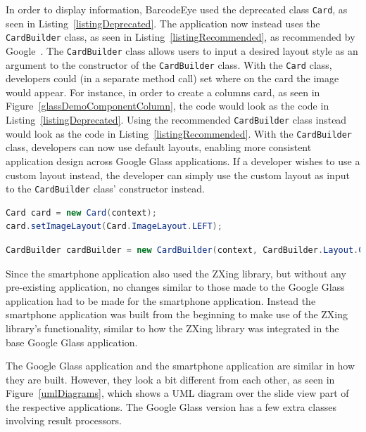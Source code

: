 In order to display information, BarcodeEye used the deprecated class \texttt{Card}, as seen in Listing~\ref{listingDeprecated}. The application now instead uses the \texttt{CardBuilder} class, as seen in Listing~\ref{listingRecommended}, as recommended by Google~\cite{googleCard}. The \texttt{CardBuilder} class allows users to input a desired layout style as an argument to the constructor of the \texttt{CardBuilder} class. With the \texttt{Card} class, developers could (in a separate method call) set where on the card the image would appear. For instance, in order to create a columns card, as seen in Figure~\ref{glassDemoComponentColumn}, the code would look as the code in Listing~\ref{listingDeprecated}. Using the recommended \texttt{CardBuilder} class instead would look as the code in Listing~\ref{listingRecommended}. With the \texttt{CardBuilder} class, developers can now use default layouts, enabling more consistent application design across Google Glass applications. If a developer wishes to use a custom layout instead, the developer can simply use the custom layout as input to the \texttt{CardBuilder} class' constructor instead.

\begin{lstlisting}[language=Java, caption={Instancing of the deprecated class Card}, label=listingDeprecated]
Card card = new Card(context);
card.setImageLayout(Card.ImageLayout.LEFT);
\end{lstlisting}

\begin{lstlisting}[language=Java, caption={Instancing of the recommended class CardBuilder}, label=listingRecommended]
CardBuilder cardBuilder = new CardBuilder(context, CardBuilder.Layout.COLUMNS);
\end{lstlisting}

Since the smartphone application also used the ZXing library, but without any pre-existing application, no changes similar to those made to the Google Glass application had to be made for the smartphone application. Instead the smartphone application was built from the beginning to make use of the ZXing library's functionality, similar to how the ZXing library was integrated in the base Google Glass application.

The Google Glass application and the smartphone application are similar in how they are built. However, they look a bit different from each other, as seen in Figure~\ref{umlDiagrams}, which shows a UML diagram over the slide view part of the respective applications. The Google Glass version has a few extra classes involving result processors.

